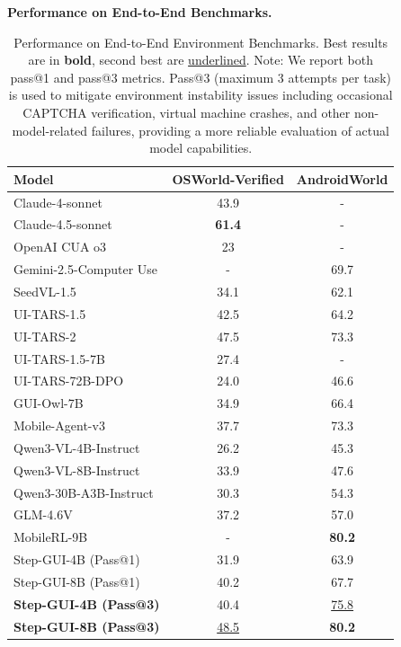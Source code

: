 \noindent\textbf{Performance on End-to-End Benchmarks.}
\begin{table}[t]
\centering
\captionsetup{justification=justified, singlelinecheck=false}
\caption{Performance on End-to-End Environment Benchmarks. Best results are in \textbf{bold}, second best are \underline{underlined}. Note: We report both pass@1 and pass@3 metrics. Pass@3 (maximum 3 attempts per task) is used to mitigate environment instability issues including occasional CAPTCHA verification, virtual machine crashes, and other non-model-related failures, providing a more reliable evaluation of actual model capabilities.} 
\label{tab:online_env_benchmarks}
\small %
\begin{tabular}{l|cc} 
\toprule
\textbf{Model} & OSWorld-Verified & AndroidWorld \\
\midrule
Claude-4-sonnet & 43.9 & - \\
Claude-4.5-sonnet & \textbf{61.4} & - \\
OpenAI CUA o3 & 23 & - \\
Gemini-2.5-Computer Use & - & 69.7 \\
SeedVL-1.5 & 34.1 & 62.1 \\
UI-TARS-1.5 & 42.5 & 64.2 \\
UI-TARS-2 & 47.5 & 73.3 \\
UI-TARS-1.5-7B & 27.4 & - \\
UI-TARS-72B-DPO & 24.0 & 46.6 \\
GUI-Owl-7B & 34.9 & 66.4 \\
Mobile-Agent-v3 & 37.7 & 73.3 \\
Qwen3-VL-4B-Instruct & 26.2 & 45.3 \\
Qwen3-VL-8B-Instruct & 33.9 & 47.6 \\
Qwen3-30B-A3B-Instruct & 30.3 & 54.3 \\
GLM-4.6V & 37.2 & 57.0 \\
MobileRL-9B & - & \textbf{80.2} \\
\midrule
Step-GUI-4B (Pass@1) & 31.9 & 63.9 \\
Step-GUI-8B (Pass@1) & 40.2 & 67.7 \\
\textbf{Step-GUI-4B (Pass@3)} & 40.4 & \underline{75.8} \\
\textbf{Step-GUI-8B (Pass@3)} & \underline{48.5} & \textbf{80.2} \\
\bottomrule
\end{tabular}
\vspace{-0.5em} 
\end{table}

